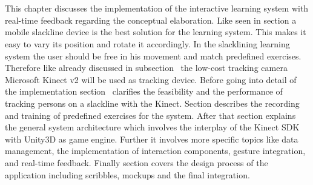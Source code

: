 \chapter{}\label{5_systemIntegration}
This chapter discusses the implementation of the interactive learning system with real-time feedback regarding the conceptual elaboration. Like seen in section \textit{} a mobile slackline device is the best solution for the learning system. This makes it easy to vary its position and rotate it accordingly. In the slacklining learning system the user should be free in his movement and match predefined exercises. Therefore like already discussed in subsection~\textit{} the low-cost tracking camera Microsoft Kinect v2 will be used as tracking device. Before going into detail of the implementation section~\textit{} clarifies the feasibility and the performance of tracking persons on a slackline with the Kinect. Section \textit{} describes the recording and training of predefined exercises for the system. After that section \textit{} explains the general system architecture which involves the interplay of the Kinect SDK with Unity3D as game engine. Further it involves more specific topics like data management, the implementation of interaction components, gesture integration, and real-time feedback. Finally section \textit{} covers the design process of the application including scribbles, mockups and the final integration.





